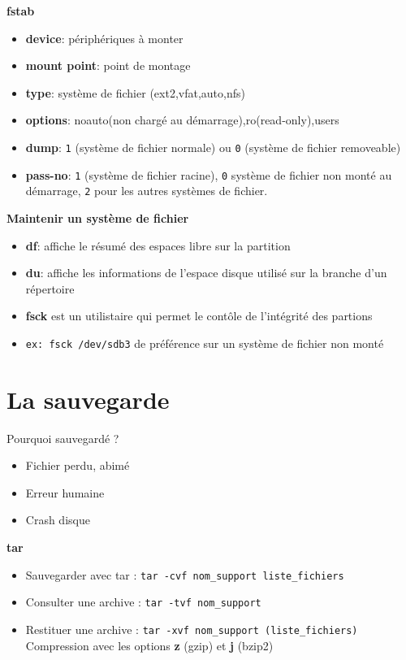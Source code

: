 \documentclass[french]{beamer}
\begin{document}
\begin{frame}
\textbf{fstab}
\begin{itemize}
\item \textbf{device}: périphériques à monter
\item \textbf{mount point}: point de montage
\item \textbf{type}: système de fichier (ext2,vfat,auto,nfs)
\item \textbf{options}: noauto(non chargé au démarrage),ro(read-only),users
\item \textbf{dump}: \texttt{1} (système de fichier normale) ou \texttt{0}
(système de fichier removeable)
\item \textbf{pass-no}: \texttt{1} (système de fichier racine), \texttt{0}
système de fichier non monté au démarrage, \texttt{2} pour les autres systèmes
de fichier.
\end{itemize}
\end{frame}

\begin{frame}
\textbf{Maintenir un système de fichier}
\begin{itemize}
\item \textbf{df}: affiche le résumé des espaces libre sur la partition
\item \textbf{du}: affiche les informations de l'espace disque utilisé sur la
branche d'un répertoire
\item \textbf{fsck} est un utilistaire qui permet le contôle de l'intégrité des
partions
\item \texttt{ex: fsck /dev/sdb3} de préférence sur un système de fichier non
monté
\end{itemize}
\end{frame}


\section{La sauvegarde}
\frame{\tableofcontents[current]}

\begin{frame}
Pourquoi sauvegardé ?
\begin{itemize}
\item Fichier perdu, abimé
\item Erreur humaine
\item Crash disque
\end{itemize}
\end{frame}

\begin{frame}
\textbf{tar}
\begin{itemize}
\item Sauvegarder avec tar : \texttt{tar -cvf nom\_support liste\_fichiers}
\item Consulter une archive : \texttt{tar -tvf  nom\_support}
\item Restituer une archive : \texttt{tar -xvf nom\_support (liste\_fichiers)}
\\
Compression avec les options \textbf{z} (gzip) et \textbf{j} (bzip2) \\
\end{itemize}
\end{frame}
\end{document}
